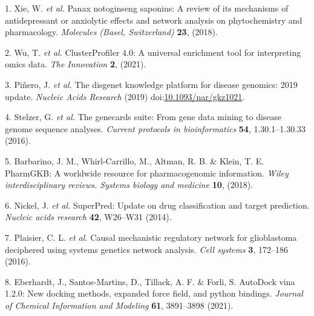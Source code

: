 \documentclass[
]{article}
\newenvironment{cslreferences}%
  {}%
  {\par}
\begin{document}
\hypertarget{refs}{}
\begin{cslreferences}
\leavevmode\hypertarget{ref-PanaxNotoginseXieW2018}{}%
1. Xie, W. \emph{et al.} Panax notoginseng saponins: A review of its mechanisms of antidepressant or anxiolytic effects and network analysis on phytochemistry and pharmacology. \emph{Molecules (Basel, Switzerland)} \textbf{23}, (2018).

\leavevmode\hypertarget{ref-ClusterprofilerWuTi2021}{}%
2. Wu, T. \emph{et al.} ClusterProfiler 4.0: A universal enrichment tool for interpreting omics data. \emph{The Innovation} \textbf{2}, (2021).

\leavevmode\hypertarget{ref-TheDisgenetKnPinero2019}{}%
3. Piñero, J. \emph{et al.} The disgenet knowledge platform for disease genomics: 2019 update. \emph{Nucleic Acids Research} (2019) doi:\href{https://doi.org/10.1093/nar/gkz1021}{10.1093/nar/gkz1021}.

\leavevmode\hypertarget{ref-TheGenecardsSStelze2016}{}%
4. Stelzer, G. \emph{et al.} The genecards suite: From gene data mining to disease genome sequence analyses. \emph{Current protocols in bioinformatics} \textbf{54}, 1.30.1--1.30.33 (2016).

\leavevmode\hypertarget{ref-PharmgkbAWorBarbar2018}{}%
5. Barbarino, J. M., Whirl-Carrillo, M., Altman, R. B. \& Klein, T. E. PharmGKB: A worldwide resource for pharmacogenomic information. \emph{Wiley interdisciplinary reviews. Systems biology and medicine} \textbf{10}, (2018).

\leavevmode\hypertarget{ref-SuperpredUpdaNickel2014}{}%
6. Nickel, J. \emph{et al.} SuperPred: Update on drug classification and target prediction. \emph{Nucleic acids research} \textbf{42}, W26--W31 (2014).

\leavevmode\hypertarget{ref-CausalMechanisPlaisi2016}{}%
7. Plaisier, C. L. \emph{et al.} Causal mechanistic regulatory network for glioblastoma deciphered using systems genetics network analysis. \emph{Cell systems} \textbf{3}, 172--186 (2016).

\leavevmode\hypertarget{ref-AutodockVina1Eberha2021}{}%
8. Eberhardt, J., Santos-Martins, D., Tillack, A. F. \& Forli, S. AutoDock vina 1.2.0: New docking methods, expanded force field, and python bindings. \emph{Journal of Chemical Information and Modeling} \textbf{61}, 3891--3898 (2021).
\end{cslreferences}
\end{document}
